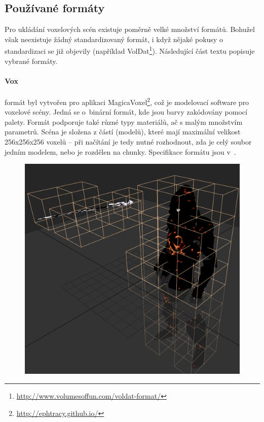 \subsection{Používané formáty} \label{sec:format}
Pro ukládání voxelových scén existuje poměrně velké množství formátů. Bohužel však neexistuje žádný standardizovaný formát, i když nějaké pokusy o standardizaci se již objevily (například VolDat\footnote{\url{http://www.volumesoffun.com/voldat-format/}}). Následující část textu popisuje vybrané formáty.

\paragraph{Vox} formát byl vytvořen pro aplikaci MagicaVoxel\footnote{\url{http://ephtracy.github.io/}}, což je modelovací software pro voxelové scény. Jedná se o~binární formát, kde jsou barvy zakódovány pomocí palety. Formát podporuje také různé typy materiálů, ač s malým množstvím parametrů. Scéna je složena z částí (modelů), které mají maximální velikost 256x256x256 voxelů -- při načítání je tedy nutné rozhodnout, zda je celý soubor jedním modelem, nebo je rozdělen na chunky. Specifikace formátu jsou v~\cite{vox_format}.

\begin{figure}[H]
	\centering
	\includegraphics[scale=0.5]{images/magica_voxel_vox.png}
	\captionsetup{justification=centering}
	\label{fig:magica_vox}
\end{figure}

